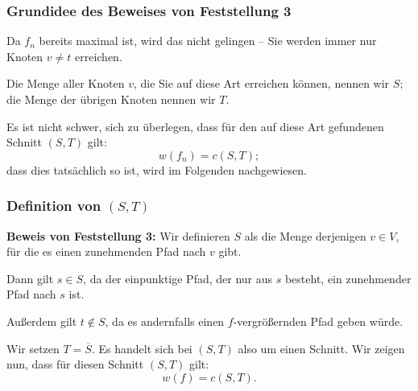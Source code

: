 \documentclass[smaller]{beamer}
\begin{document}
\begin{frame}
 \frametitle{Grundidee des Beweises von Feststellung 3}
 Da $f_n$ bereits maximal ist, wird das nicht gelingen -- Sie werden immer nur Knoten $v \neq t$ erreichen. \\ \vspace*{0.2cm}
 
  Die Menge aller Knoten $v$, die Sie auf diese Art erreichen können, nennen wir $S$; die Menge der übrigen Knoten nennen wir $T$. \\ \vspace*{0.2cm}

 Es ist nicht schwer, sich zu überlegen, dass für den auf diese Art gefundenen Schnitt $(S,T)$ gilt: $$w(f_n) = c(S,T);$$ dass dies tatsächlich so ist, wird im Folgenden nachgewiesen.
\end{frame}

\begin{frame}
 \frametitle{Definition von $(S,T)$}
  \textbf{Beweis von Feststellung 3:} Wir definieren $S$ als die Menge derjenigen $v \in V$, für die es einen zunehmenden Pfad nach $v$ gibt. \\ \vspace*{0.2cm}

  Dann gilt $s \in S$, da der einpunktige Pfad, der nur aus $s$ besteht, ein zunehmender Pfad nach $s$ ist. \\ \vspace*{0.2cm} 
  
  Außerdem gilt $t \not\in S$, da es andernfalls einen $f$-vergrößernden Pfad geben würde. \\ \vspace*{0.2cm}
  
  Wir setzen $T = \overline{S}$. Es handelt sich bei $(S,T)$ also um einen Schnitt. \alert{Wir zeigen nun, dass für diesen Schnitt $(S,T)$ gilt:}
 \begin{equation} \label{eq:9:12}
 w(f) = c(S,T).
 \end{equation}
\end{frame}
\end{document}
